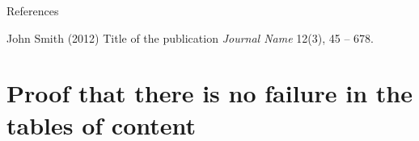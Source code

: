 \begin{frame}{References}
    \footnotesize{
        \begin{thebibliography}{99}
             John Smith (2012)
            \newblock Title of the publication
            \newblock \emph{Journal Name} 12(3), 45 -- 678.
        \end{thebibliography}
    }
\end{frame}

\section[Test]{Proof that there is no failure in the tables of content}